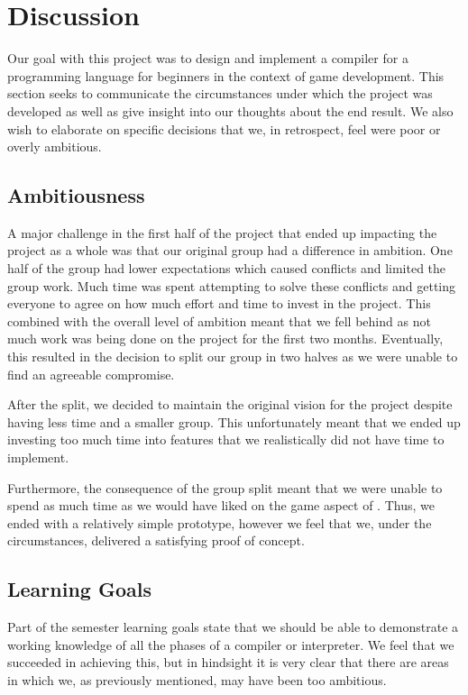 \chapter{Discussion} \label{chap:Discussion}
Our goal with this project was to design and implement a compiler for a programming language for beginners in the context of game development. 
This section seeks to communicate the circumstances under which the project was developed as well as give insight into our thoughts about the end result.
We also wish to elaborate on specific decisions that we, in retrospect, feel were poor or overly ambitious.

\section{Ambitiousness}
A major challenge in the first half of the project that ended up impacting the project as a whole was that our original group had a difference in ambition. 
One half of the group had lower expectations which caused conflicts and limited the group work.
Much time was spent attempting to solve these conflicts and getting everyone to agree on how much effort and time to invest in the project.
This combined with the overall level of ambition meant that we fell behind as not much work was being done on the project for the first two months. 
Eventually, this resulted in the decision to split our group in two halves as we were unable to find an agreeable compromise.

After the split, we decided to maintain the original vision for the project despite having less time and a smaller group. This unfortunately meant that we ended up investing too much time into features that we realistically did not have time to implement.

Furthermore, the consequence of the group split meant that we were unable to spend as much time as we would have liked on the game aspect of \dazel{}. 
Thus, we ended with a relatively simple prototype, however we feel that we, under the circumstances, delivered a satisfying proof of concept.

\section{Learning Goals}
Part of the semester learning goals state that we should be able to demonstrate a working knowledge of all the phases of a compiler or interpreter. We feel that we succeeded in achieving this, but in hindsight it is very clear that there are areas in which we, as previously mentioned, may have been too ambitious. 

